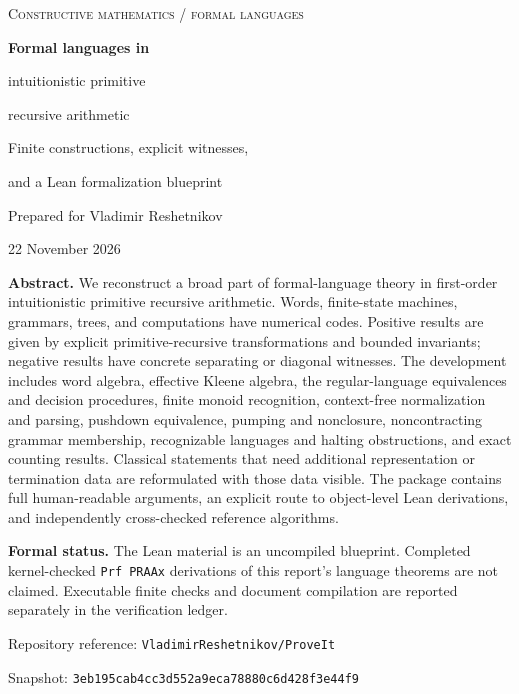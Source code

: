 \documentclass[10pt,letterpaper]{article}
\theoremstyle{definition}
\theoremstyle{remark}
\begin{document}
\begin{titlepage}
\vspace*{0.7in}
{\color{blue!40!black}\Large\textsc{Constructive mathematics / formal languages}}\par
\vspace{0.35in}
{\Huge\bfseries Formal languages in\par
intuitionistic primitive\par
recursive arithmetic}\par
\vspace{0.3in}
{\Large Finite constructions, explicit witnesses,\par
and a Lean formalization blueprint}\par
\vspace{0.45in}
{\large Prepared for Vladimir Reshetnikov}\par
{22 November 2026}\par
\vspace{0.5in}
\begin{minipage}{0.94\textwidth}
\textbf{Abstract.}
We reconstruct a broad part of formal-language theory in first-order
intuitionistic primitive recursive arithmetic. Words, finite-state machines,
grammars, trees, and computations have numerical codes. Positive results
are given by explicit primitive-recursive transformations and bounded
invariants; negative results have concrete separating or diagonal witnesses.
The development includes word algebra, effective Kleene algebra, the
regular-language equivalences and decision procedures, finite monoid
recognition, context-free normalization and parsing, pushdown equivalence,
pumping and nonclosure, noncontracting grammar membership, recognizable
languages and halting obstructions, and exact counting results.
Classical statements that need additional representation or termination
data are reformulated with those data visible. The package contains full
human-readable arguments, an explicit route to object-level Lean
derivations, and independently cross-checked reference algorithms.

\vspace{0.2in}
\textbf{Formal status.}
The Lean material is an uncompiled blueprint. Completed kernel-checked
\texttt{Prf PRAAx} derivations of this report's language theorems are not
claimed. Executable finite checks and document compilation are reported
separately in the verification ledger.
\end{minipage}
\vfill
{\small Repository reference: \texttt{VladimirReshetnikov/ProveIt}\par
Snapshot: \texttt{3eb195cab4cc3d552a9eca78880c6d428f3e44f9}}
\end{titlepage}

\begingroup
\setlength{\parskip}{0pt}
\small
\tableofcontents
\endgroup
\clearpage







\clearpage

\clearpage

\clearpage

\end{document}
